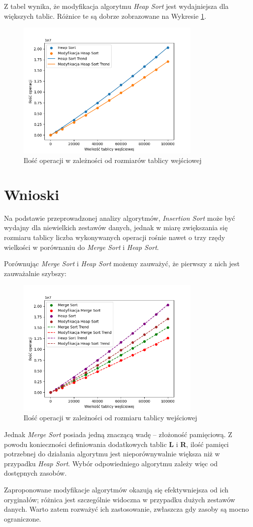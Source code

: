 \documentclass{article}
\begin{document}
Z tabel wynika, że modyfikacja algorytmu \textit{Heap Sort} jest wydajniejsza dla większych tablic. Różnice te są dobrze zobrazowane na Wykresie \ref{fig:heap}.

\begin{figure}[H]
    \centering
    \includegraphics[width=0.8\textwidth]{Figure_3.png}
    \caption{Ilość operacji w zależności od rozmiarów tablicy wejściowej}
    \label{fig:heap}
\end{figure}
\section{Wnioski}
Na podstawie przeprowadzonej analizy algorytmów, \textit{Insertion Sort} może być wydajny dla niewielkich zestawów danych, jednak w miarę zwiększania się rozmiaru tablicy liczba wykonywanych operacji rośnie nawet o trzy rzędy wielkości w porównaniu do \textit{Merge Sort} i \textit{Heap Sort}.

Porównując \textit{Merge Sort} i \textit{Heap Sort} możemy zauważyć, że pierwszy z nich jest zauważalnie szybszy:
\begin{figure}[H]
    \centering
    \includegraphics[width=0.8\textwidth]{Figure_4.png}
    \caption{Ilość operacji w zależności od rozmiaru tablicy wejściowej}
    \label{fig:heapmerge}
\end{figure}
Jednak \textit{Merge Sort} posiada jedną znaczącą wadę – złożoność pamięciową. Z powodu konieczności definiowania dodatkowych tablic \textbf{L} i \textbf{R}, ilość pamięci potrzebnej do działania algorytmu jest nieporównywalnie większa niż w przypadku \textit{Heap Sort}. Wybór odpowiedniego algorytmu zależy więc od dostępnych zasobów.

Zaproponowane modyfikacje algorytmów okazują się efektywniejsza od ich oryginałów; różnica jest szczególnie widoczna w przypadku dużych zestawów danych. Warto zatem rozważyć ich zastosowanie, zwłaszcza gdy zasoby są mocno ograniczone.
\end{document}
